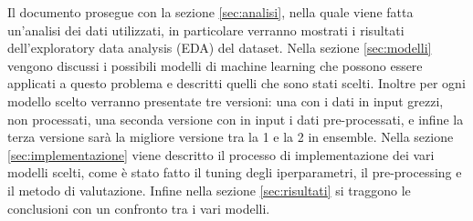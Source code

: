 Il documento prosegue con la sezione \ref{sec:analisi}, nella quale viene fatta un'analisi dei dati utilizzati, in particolare verranno mostrati i risultati dell'exploratory data analysis (EDA) del dataset. Nella sezione \ref{sec:modelli} vengono discussi i possibili modelli di machine learning che possono essere applicati a questo problema e descritti quelli che sono stati scelti. Inoltre per ogni modello scelto verranno presentate tre versioni: una con i dati in input grezzi, non processati, una seconda versione con in input i dati pre-processati, e infine la terza versione sarà la migliore versione tra la 1 e la 2 in ensemble. Nella sezione \ref{sec:implementazione} viene descritto il processo di implementazione dei vari modelli scelti, come è stato fatto il tuning degli iperparametri, il pre-processing e il metodo di valutazione. Infine nella sezione \ref{sec:risultati} si traggono le conclusioni con un confronto tra i vari modelli.